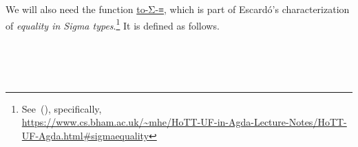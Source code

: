 We will also need the function
\href{https://www.cs.bham.ac.uk/~mhe/HoTT-UF-in-Agda-Lecture-Notes/HoTT-UF-Agda.html\#sigmaequality}{to-Σ-≡},
which is part of Escardó's characterization of \emph{equality in Sigma types}.\footnote{See~(\cite{MHE}), specifically,\\\url{https://www.cs.bham.ac.uk/~mhe/HoTT-UF-in-Agda-Lecture-Notes/HoTT-UF-Agda.html\#sigmaequality}} It is defined as follows.
\ccpad
\begin{code}%
\>[1]\AgdaSpace{}%
\AgdaSymbol{:}\AgdaSpace{}%
\>[111I]\AgdaSymbol{\{}\AgdaSpace{}%
\AgdaSymbol{:}\AgdaSpace{}%
\AgdaSpace{}%
%
\AgdaSymbol{\}}\AgdaSpace{}%
\AgdaSymbol{\{}\AgdaSpace{}%
\AgdaSymbol{:}\AgdaSpace{}%
\AgdaSpace{}%
\AgdaSpace{}%
\AgdaSpace{}%
%
\AgdaSymbol{\}}\AgdaSpace{}%
\AgdaSymbol{\{}\AgdaSpace{}%
\AgdaSpace{}%
\AgdaSymbol{:}\AgdaSpace{}%
\AgdaSpace{}%
\AgdaSymbol{\}}\<%
\\
\>[1][@{}l@{\AgdaIndent{0}}]%
\>[2]%
\>[.][@{}l@{}]\<[111I]%
\>[10]\AgdaSpace{}%
\AgdaSpace{}%
\AgdaSpace{}%
\AgdaSpace{}%
\AgdaSpace{}%
\AgdaSpace{}%
\AgdaSpace{}%
\AgdaSpace{}%
\AgdaSpace{}%
\AgdaSpace{}%
\AgdaFunction{,}\AgdaSpace{}%
\AgdaSymbol{(}\AgdaSpace{}%
\AgdaSpace{}%
\AgdaSpace{}%
\AgdaSpace{}%
\AgdaSpace{}%
\AgdaSymbol{)}\AgdaSpace{}%
\AgdaSpace{}%
\AgdaSpace{}%
\AgdaSpace{}%
\<%
\\
\>[.][@{}l@{}]\<[111I]%
\>[10]\AgdaComment{--------------------------------------------------------------}\<%
\\

\end{code}

